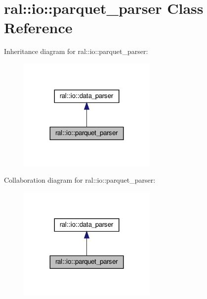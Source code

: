 \hypertarget{classral_1_1io_1_1parquet__parser}{}\section{ral\+:\+:io\+:\+:parquet\+\_\+parser Class Reference}
\label{classral_1_1io_1_1parquet__parser}


Inheritance diagram for ral\+:\+:io\+:\+:parquet\+\_\+parser\+:\nopagebreak
\begin{figure}[H]
\begin{center}
\leavevmode
\includegraphics[width=191pt]{classral_1_1io_1_1parquet__parser__inherit__graph}
\end{center}
\end{figure}


Collaboration diagram for ral\+:\+:io\+:\+:parquet\+\_\+parser\+:\nopagebreak
\begin{figure}[H]
\begin{center}
\leavevmode
\includegraphics[width=191pt]{classral_1_1io_1_1parquet__parser__coll__graph}
\end{center}
\end{figure}
